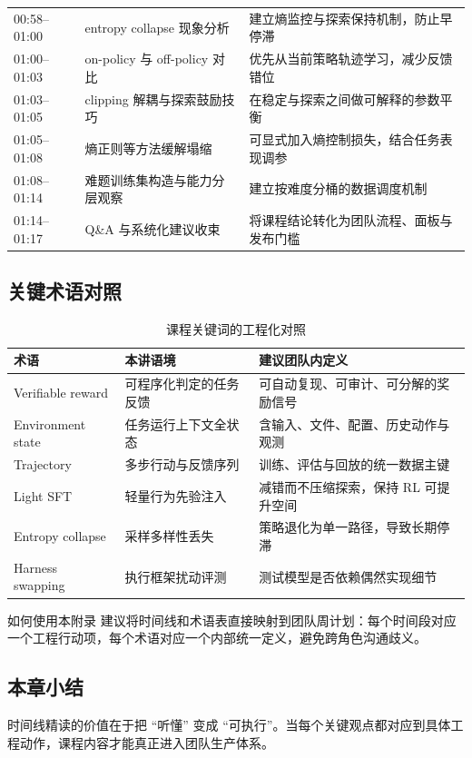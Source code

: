 \begin{longtable}{p{1.8cm}p{3.8cm}p{5.4cm}}
00:58--01:00 & entropy collapse 现象分析 & 建立熵监控与探索保持机制，防止早停滞 \\
01:00--01:03 & on-policy 与 off-policy 对比 & 优先从当前策略轨迹学习，减少反馈错位 \\
01:03--01:05 & clipping 解耦与探索鼓励技巧 & 在稳定与探索之间做可解释的参数平衡 \\
01:05--01:08 & 熵正则等方法缓解塌缩 & 可显式加入熵控制损失，结合任务表现调参 \\
01:08--01:14 & 难题训练集构造与能力分层观察 & 建立按难度分桶的数据调度机制 \\
01:14--01:17 & Q\&A 与系统化建议收束 & 将课程结论转化为团队流程、面板与发布门槛 \\
\bottomrule
\end{longtable}

\subsection{关键术语对照}
\begin{table}[H]
\centering
\begin{tabular}{p{3.0cm}p{2.8cm}p{4.5cm}}
\toprule
\textbf{术语} & \textbf{本讲语境} & \textbf{建议团队内定义} \\
\midrule
Verifiable reward & 可程序化判定的任务反馈 & 可自动复现、可审计、可分解的奖励信号 \\
Environment state & 任务运行上下文全状态 & 含输入、文件、配置、历史动作与观测 \\
Trajectory & 多步行动与反馈序列 & 训练、评估与回放的统一数据主键 \\
Light SFT & 轻量行为先验注入 & 减错而不压缩探索，保持 RL 可提升空间 \\
Entropy collapse & 采样多样性丢失 & 策略退化为单一路径，导致长期停滞 \\
Harness swapping & 执行框架扰动评测 & 测试模型是否依赖偶然实现细节 \\
\bottomrule
\end{tabular}
\caption{课程关键词的工程化对照}
\end{table}

\begin{knowledgebox}{如何使用本附录}
建议将时间线和术语表直接映射到团队周计划：每个时间段对应一个工程行动项，每个术语对应一个内部统一定义，避免跨角色沟通歧义。
\end{knowledgebox}

\subsection{本章小结}
时间线精读的价值在于把 ``听懂'' 变成 ``可执行''。当每个关键观点都对应到具体工程动作，课程内容才能真正进入团队生产体系。


